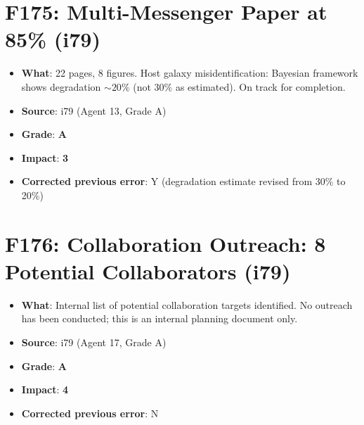 \documentclass[11pt,a4paper]{article}
\newcommand{\grade}[1]{\textbf{#1}}
\newcommand{\impact}[1]{\textbf{#1}}
\begin{document}
\section{F175: Multi-Messenger Paper at 85\% (i79)}
\begin{itemize}[nosep]
\item \textbf{What}: 22 pages, 8 figures. Host galaxy misidentification: Bayesian framework shows degradation $\sim 20\%$ (not $30\%$ as estimated). On track for completion.
\item \textbf{Source}: i79 (Agent 13, Grade A)
\item \textbf{Grade}: \grade{A}
\item \textbf{Impact}: \impact{3}
\item \textbf{Corrected previous error}: Y (degradation estimate revised from 30\% to 20\%)
\end{itemize}

\section{F176: Collaboration Outreach: 8 Potential Collaborators (i79)}
\begin{itemize}[nosep]
\item \textbf{What}: Internal list of potential collaboration targets identified. No outreach has been conducted; this is an internal planning document only.
\item \textbf{Source}: i79 (Agent 17, Grade A)
\item \textbf{Grade}: \grade{A}
\item \textbf{Impact}: \impact{4}
\item \textbf{Corrected previous error}: N
\end{itemize}

\end{document}
